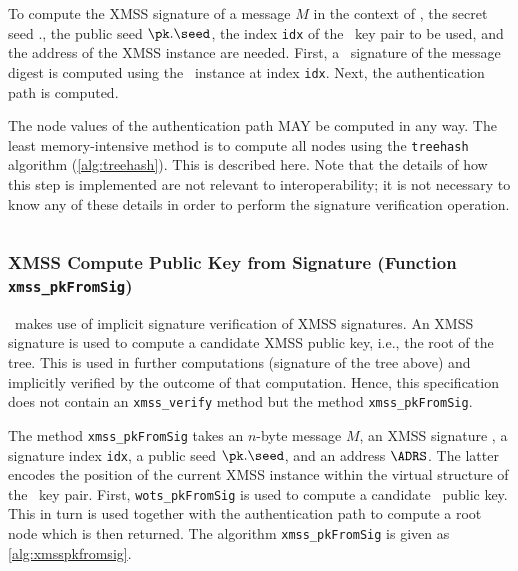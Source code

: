 To compute the XMSS signature of a message $M$ in the context of \SPHINCSA, the secret seed \sk.\seed, the public seed $\pk.\seed$, the index \texttt{idx} of the \WOTSCS\ key pair to be used, and the address \ADRS of the XMSS instance are needed. First, a \WOTSCS\ signature of the message digest is computed using the \WOTSCS\ instance at index \texttt{idx}. Next, the authentication path is computed.

The node values of the authentication path MAY be computed in any way. The least memory-intensive method is to compute all nodes using the \texttt{treehash} algorithm (\cref{alg:treehash}). This is described here. Note that the details of how this step is implemented are not relevant to interoperability; it is not necessary to know any of these details in order to perform the signature verification operation.

\begin{algorithm}
\inputminted[breaklines,linenos,tabsize=2,mathescape,escapeinside=||]{C}{code/xmss_sign.cs}
\caption{\texttt{xmss\_sign} --- Generating an XMSS signature.}
\label{alg:xmsssign}
\end{algorithm}

\subsubsection{XMSS Compute Public Key from Signature (Function \texttt{xmss\_pkFromSig})}

\SPHINCSA\ makes use of implicit signature verification of XMSS signatures. An XMSS signature is used to compute a candidate XMSS public key, i.e., the root of the tree. This is used in further computations (signature of the tree above) and implicitly verified by the outcome of that computation. Hence, this specification does not contain an \texttt{xmss\_verify} method but the method \texttt{xmss\_pkFromSig}.

The method \texttt{xmss\_pkFromSig} takes an $n$-byte message $M$, an XMSS signature \sigxmss, a signature index \texttt{idx}, a public seed $\pk.\seed$, and an address $\ADRS$. The latter encodes the position of the current XMSS instance within the virtual structure of the \SPHINCSA\ key pair. First, \texttt{wots\_pkFromSig} is used to compute a candidate \WOTSCS\ public key. This in turn is used together with the authentication path to compute a root node which is then returned. The algorithm \texttt{xmss\_pkFromSig} is given as \cref{alg:xmsspkfromsig}.

\begin{algorithm}
\inputminted[breaklines,linenos,tabsize=2,mathescape,escapeinside=||]{C}{code/xmss_pkFromSig.cs}
\caption{\texttt{xmss\_pkFromSig} --- Computing an XMSS public key from an XMSS signature.}
\label{alg:xmsspkfromsig}
\end{algorithm}




